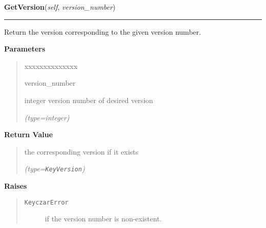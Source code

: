 \hspace{.8\funcindent}\begin{boxedminipage}{\funcwidth}

    \raggedright \textbf{GetVersion}(\textit{self}, \textit{version\_number})

    \vspace{-1.5ex}

    \rule{\textwidth}{0.5\fboxrule}
\setlength{\parskip}{2ex}
    Return the version corresponding to the given version number.

\setlength{\parskip}{1ex}
      \textbf{Parameters}
      \vspace{-1ex}

      \begin{quote}
        \begin{Ventry}{xxxxxxxxxxxxxx}

          \item[version\_number]

          integer version number of desired version

            {\it (type=integer)}

        \end{Ventry}

      \end{quote}

      \textbf{Return Value}
    \vspace{-1ex}

      \begin{quote}
      the corresponding version if it exists

      {\it (type=\texttt{KeyVersion})}

      \end{quote}

      \textbf{Raises}
    \vspace{-1ex}

      \begin{quote}
        \begin{description}

          \item[\texttt{KeyczarError}]

          if the version number is non-existent.

        \end{description}

      \end{quote}

    \end{boxedminipage}

